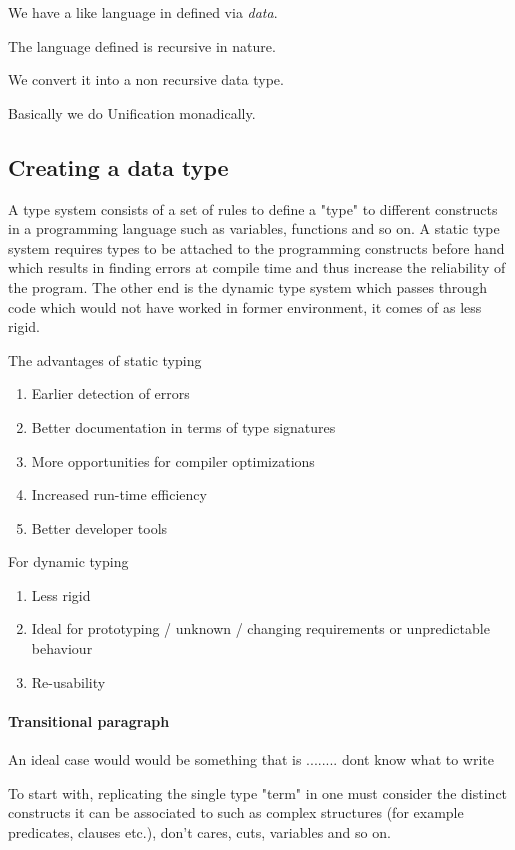 \documentclass[proposal.tex]{subfiles}
\begin{document}
We have a  like language in  defined via \textit{data}.

The language defined is recursive in nature. 

We convert it into a non recursive data type.


Basically we do Unification monadically.

  


\subsection{Creating a data type}

A type system consists of a set of rules to define a "type" to different constructs in a programming language such as variables, functions 
and so on. A static type system requires types to be attached to the programming constructs before hand which results in finding errors at 
compile time and thus increase the reliability of the program. The other end is the dynamic type system which passes through code which 
would not have worked in former environment, it comes of as less rigid.

The advantages of static typing \cite{meijer2004static}
\begin{enumerate}
\item Earlier detection of errors
\item Better documentation in terms of type signatures
\item More opportunities for compiler optimizations
\item Increased run-time efficiency
\item Better developer tools 
\end{enumerate}          

For dynamic typing
\begin{enumerate}
\item Less rigid
\item Ideal for prototyping / unknown / changing requirements or unpredictable behaviour 
\item Re-usability  
\end{enumerate}

\paragraph{Transitional paragraph}
An ideal case would would be something that is ........ dont know what to write


To start with, replicating the single type "term" in  one must consider the distinct constructs it can be associated to 
such as complex structures (for example predicates, clauses etc.), don't cares, cuts, variables and so on.
\end{document}
